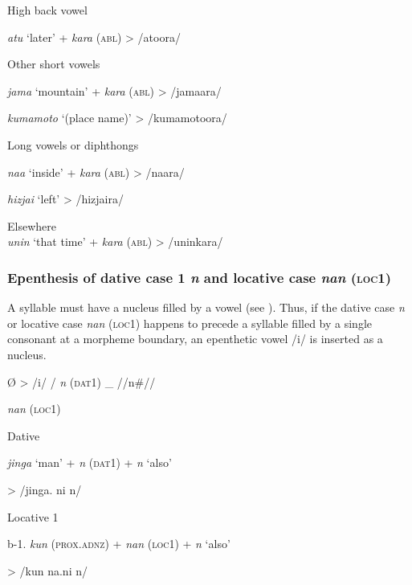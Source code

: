 \begin{table}
\ex High back vowel  \\
\gll

    \textit{atu}  ‘later’  +  \textit{kara} (\textsc{abl})  >  /atoora/

\ex Other short vowels\\
\gll

    \textit{jama}  ‘mountain’  +  \textit{kara} (\textsc{abl})  >  /jamaara/

    \textit{kumamoto}  ‘(place name)’      >  /kumamotoora/  

\ex Long vowels or diphthongs  \\
\gll

    \textit{naa}  ‘inside’  +  \textit{kara} (\textsc{abl})  >  /naara/

    \textit{hizjai}  ‘left’      >  /hizjaira/  

\ex  Elsewhere\\
\textit{unin}  ‘that time’  +  \textit{kara} (\textsc{abl})  >  /uninkara/\\

\subsubsection{Epenthesis of dative case 1 \textit{n} and locative case \textit{nan} (\textsc{loc}1)}

A syllable must have a nucleus filled by a vowel (see ). Thus, if the dative case \textit{n} or locative case \textit{nan} (\textsc{loc}1) happens to precede a syllable filled by a single consonant at a morpheme boundary, an epenthetic vowel /i/ is inserted as a nucleus.

\ea\label{ex:6-35}
  Ø  >  /i/  /  %
  \textit{n}  %
(\textsc{dat}1)    \_  //n\#//

            \textit{nan}  (\textsc{loc}1)

\ea\label{ex:6-36}
 \ea Dative\\
\gll

    \textit{jinga}  ‘man’  +  \textit{n}  (\textsc{dat}1)  +  \textit{n}  ‘also’

  >  /jinga.      ni      n/  

\ex Locative 1\\
\gll

  b-1.  \textit{kun}  (\textsc{prox}.\textsc{adnz})  +  \textit{nan}  (\textsc{loc}1)  +  \textit{n}  ‘also’

  >  /kun      na.ni      n/  


\end{table}
